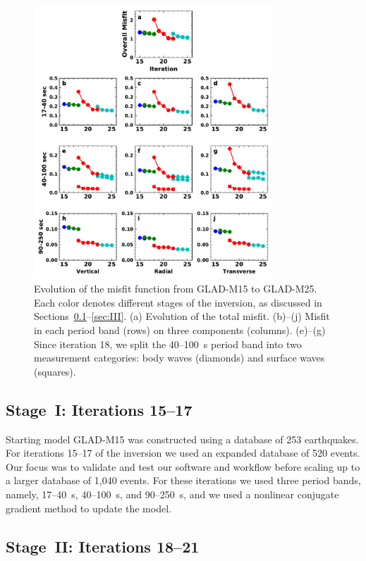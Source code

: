 \documentclass[extra,mreferee]{gji}
\begin{document}
\begin{figure}
  \centering
  \includegraphics[width=0.8\textwidth]{figures/misfit.pdf}
  \caption{\small{Evolution of the misfit function from GLAD-M15 to GLAD-M25.
  Each color denotes different stages of the inversion, as discussed in Sections~\ref{sec:I}--\ref{sec:III}.
  (a) Evolution of the total misfit. (b)--(j) Misfit in
  each period band (rows) on three components (columns). (e)--(g) Since iteration 18,
  we  split the 40--100~s period band into two
  measurement categories: body waves (diamonds) and surface waves
  (squares).
  }}
  \label{fig:misfit}
\end{figure}

\subsection{Stage~I: Iterations 15--17}
\label{sec:I}

Starting model GLAD-M15 was constructed using a database of 253 earthquakes.
For iterations 15--17 of the inversion we used an expanded database of 520 events.
Our focus was to validate and test our software and workflow before scaling up
to a larger database of 1,040 events.
For these iterations we used three period bands, namely,
17--40~s, 40--100~s, and 90--250~s,
and we used a nonlinear conjugate
gradient method to update the model.

\subsection{Stage~II: Iterations 18--21}
\end{document}
